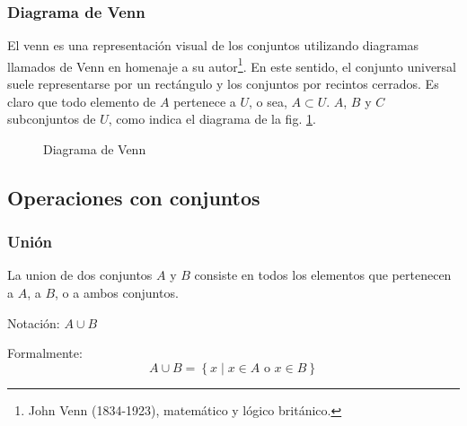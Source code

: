 \subsubsection{Diagrama de Venn}

El \gls{venn} es una representación visual de los conjuntos utilizando diagramas llamados de Venn en homenaje a su autor\footnote{John Venn (1834-1923), matemático y lógico británico.}. En este sentido, el conjunto universal suele representarse por un rectángulo y los conjuntos por recintos cerrados. Es claro que todo elemento de $A$ pertenece a $U$, o sea, $A \subset U$. $A$, $B$ y $C$ subconjuntos de $U$, como indica el diagrama de la fig. \ref{fig:Venn}.

\begin{figure}[H]
	\centering
	\caption{Diagrama de Venn}
	\label{fig:Venn}
\end{figure}

\subsection{Operaciones con conjuntos}

\subsubsection{Unión }
\vspace{1em} 
\begin{fmd-definition}[Unión]
	La \gls{union} de dos conjuntos \(A\) y \(B\) consiste en todos los elementos que pertenecen a \(A\), a \(B\), o a ambos conjuntos.
	
	Notación: \(A \cup B\)
	
	Formalmente:
	\[ A \cup B = \left\{ x \mid x \in A \mbox{ o } x \in B \right\} \]
\end{fmd-definition}

